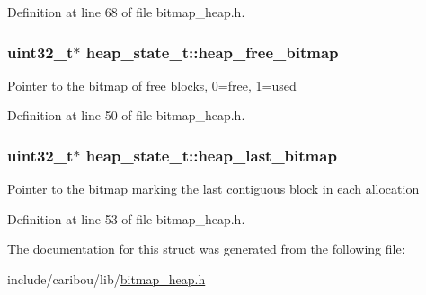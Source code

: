 Definition at line 68 of file bitmap\-\_\-heap.\-h.

\hypertarget{structheap__state__t_a1f6018b4dc58b24cb0f8454a6e60d922}{
\subsubsection[{heap\-\_\-free\-\_\-bitmap}]{\setlength{\rightskip}{0pt plus 5cm}uint32\-\_\-t$\ast$ heap\-\_\-state\-\_\-t\-::heap\-\_\-free\-\_\-bitmap}}\label{structheap__state__t_a1f6018b4dc58b24cb0f8454a6e60d922}
Pointer to the bitmap of free blocks, 0=free, 1=used 

Definition at line 50 of file bitmap\-\_\-heap.\-h.

\hypertarget{structheap__state__t_ad10537035000bee6924f49d8f2b5d82e}{
\subsubsection[{heap\-\_\-last\-\_\-bitmap}]{\setlength{\rightskip}{0pt plus 5cm}uint32\-\_\-t$\ast$ heap\-\_\-state\-\_\-t\-::heap\-\_\-last\-\_\-bitmap}}\label{structheap__state__t_ad10537035000bee6924f49d8f2b5d82e}
Pointer to the bitmap marking the last contiguous block in each allocation 

Definition at line 53 of file bitmap\-\_\-heap.\-h.



The documentation for this struct was generated from the following file\-:\begin{DoxyCompactItemize}
\item 
include/caribou/lib/\hyperlink{bitmap__heap_8h}{bitmap\-\_\-heap.\-h}\end{DoxyCompactItemize}
